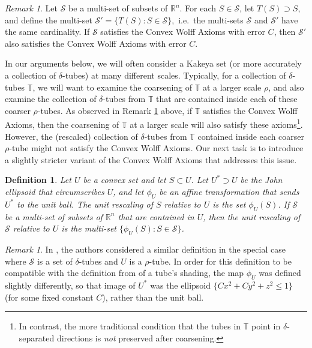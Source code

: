 \documentclass[letterpaper, reqno,11pt]{article}
\numberwithin{equation}{section}
\newcommand{\RR}{\mathbb{R}}
\newcommand{\tubes}{\mathbb{T}}
\numberwithin{thm}{section}
\newtheorem{defn}[thm]{Definition}
\theoremstyle{remark}
\newtheorem{rem}[thm]{Remark}
\begin{document}
\begin{rem}\label{convexSupSet}
Let $\mathcal{S}$ be a multi-set of subsets of $\RR^n$. For each $S\in\mathcal{S}$, let $T(S)\supset S$, and define the multi-set $\mathcal{S}'=\{T(S)\colon S\in\mathcal{S}\},$ i.e.~the multi-sets $\mathcal{S}$ and $\mathcal{S}'$ have the same cardinality. If $\mathcal{S}$ satisfies the Convex Wolff Axioms with error $C$, then $\mathcal{S}'$ also satisfies the Convex Wolff Axioms with error $C$. 
\end{rem}


In our arguments below, we will often consider a Kakeya set (or more accurately a collection of $\delta$-tubes) at many different scales. Typically, for a collection of $\delta$-tubes $\tubes$, we will want to examine the coarsening of $\tubes$ at a larger scale $\rho$, and also examine the collection of $\delta$-tubes from $\tubes$ that are contained inside each of these coarser $\rho$-tubes. As observed in Remark \ref{convexSupSet} above, if $\tubes$ satisfies the Convex Wolff Axioms, then the coarsening of $\tubes$ at a larger scale will also satisfy these axioms\footnote{In contrast, the more traditional condition that the tubes in $\tubes$ point in $\delta$-separated directions is \emph{not} preserved after coarsening.}. However, the (rescaled) collection of $\delta$-tubes from $\tubes$ contained inside each coarser $\rho$-tube might not satisfy the Convex Wolff Axioms. Our next task is to introduce a slightly stricter variant of the Convex Wolff Axioms that addresses this issue.


\begin{defn}\label{unitRescalingDefn}
Let $U$ be a convex set and let $S\subset U$. Let $U^*\supset U$ be the John ellipsoid that circumscribes $U$, and let $\phi_U$ be an affine transformation that sends $U^*$ to the unit ball. The \emph{unit rescaling of $S$ relative to $U$} is the set $\phi_U(S)$. If $\mathcal{S}$ be a multi-set of subsets of $\RR^n$ that are contained in $U$, then the \emph{unit rescaling of $\mathcal{S}$ relative to $U$} is the multi-set $\{\phi_U(S)\colon S\in\mathcal{S}\}$. 
\end{defn}

\begin{rem}
In \cite{WZ}, the authors considered a similar definition in the special case where $\mathcal{S}$ is a set of $\delta$-tubes and $U$ is a $\rho$-tube. In order for this definition to be compatible with the definition from \cite{WZ} of a tube's shading, the map $\phi_U$ was defined slightly differently, so that image of $U^*$ was the ellipsoid $\{Cx^2+Cy^2+z^2\leq 1\}$ (for some fixed constant $C$), rather than the unit ball. 
\end{rem}
\end{document}
